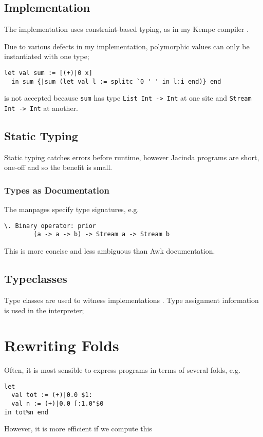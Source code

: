 \documentclass{report}
\begin{document}
\subsection{Implementation}

The implementation uses constraint-based typing, as in my Kempe compiler \cite{kempe}. 

Due to various defects in my implementation, polymorphic values can only be instantiated with one type;

\begin{verbatim}
let val sum := [(+)|0 x]
  in sum {|sum (let val l := splitc `0 ' ' in l:i end)} end
\end{verbatim}

is not accepted because {\tt sum} has type {\tt List Int -> Int} at one site and {\tt Stream Int -> Int} at another.

\subsection{Static Typing}

Static typing catches errors before runtime, however Jacinda programs are short, one-off and so the benefit is small.


\subsubsection{Types as Documentation}

The manpages specify type signatures, e.g.

\begin{verbatim}
\. Binary operator: prior
        (a -> a -> b) -> Stream a -> Stream b
\end{verbatim}

This is more concise and less ambiguous than Awk documentation.

\subsection{Typeclasses}

Type classes are used to witness implementations \cite{adhoc}. Type assignment information is used in the interpreter;

\section{Rewriting Folds}

Often, it is most sensible to express programs in terms of several folds, e.g.

\begin{verbatim}
let
  val tot := (+)|0.0 $1:
  val n := (+)|0.0 [:1.0"$0
in tot%n end
\end{verbatim}

However, it is more efficient if we compute this



\end{document}
